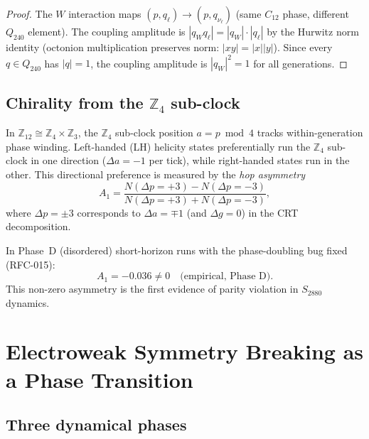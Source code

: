 \documentclass[11pt,a4paper]{article}
\theoremstyle{remark}
\begin{document}
\begin{proof}
  The $W$ interaction maps $(p, q_{\ell}) \to (p, q_{\nu_\ell})$ (same $C_{12}$ phase,
  different $Q_{240}$ element).  The coupling amplitude is
  $|q_W q_\ell| = |q_W| \cdot |q_\ell|$ by the Hurwitz norm identity
  (octonion multiplication preserves norm: $|xy| = |x||y|$).
  Since every $q \in Q_{240}$ has $|q| = 1$, the coupling amplitude is $|q_W|^2 = 1$
  for all generations.
\end{proof}

\subsection{Chirality from the $\mathbb{Z}_4$ sub-clock}

In $\mathbb{Z}_{12} \cong \mathbb{Z}_4 \times \mathbb{Z}_3$, the $\mathbb{Z}_4$ sub-clock
position $a = p \bmod 4$ tracks within-generation phase winding.
Left-handed (LH) helicity states preferentially run the $\mathbb{Z}_4$ sub-clock in one
direction ($\Delta a = -1$ per tick), while right-handed states run in the other.
This directional preference is measured by the \emph{hop asymmetry}
\begin{equation}
  A_1 = \frac{N(\Delta p = +3) - N(\Delta p = -3)}{N(\Delta p = +3) + N(\Delta p = -3)} ,
\end{equation}
where $\Delta p = \pm 3$ corresponds to $\Delta a = \mp 1$ (and $\Delta g = 0$)
in the CRT decomposition.

In Phase~D (disordered) short-horizon runs with the phase-doubling bug fixed (RFC-015):
\begin{equation}
  A_1 = -0.036 \neq 0 \quad \text{(empirical, Phase D)} .
\label{eq:A1_empirical}
\end{equation}
This non-zero asymmetry is the first evidence of parity violation in $S_{2880}$ dynamics.

\section{Electroweak Symmetry Breaking as a Phase Transition}
\label{sec:phase_transition}

\subsection{Three dynamical phases}
\end{document}
